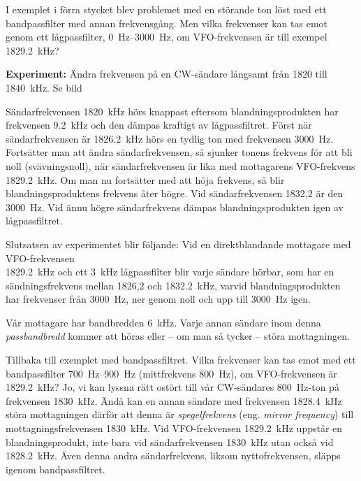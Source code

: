 I exemplet i förra stycket blev problemet med en störande ton löst med
ett bandpassfilter med annan frekvensgång.
Men vilka frekvenser kan tas emot genom ett lågpassfilter,
\SIrange{0}{3000}{\hertz}, om VFO-frekvensen är till exempel
\qty{1829,2}{\kilo\hertz}?

\textbf{Experiment:}
Ändra frekvensen på en CW-sändare långsamt från 1820 till
\qty{1840}{\kilo\hertz}.
Se bild 

Sändarfrekvensen \qty{1820}{\kilo\hertz} hörs knappast eftersom
blandningsprodukten har frekvensen \qty{9,2}{\kilo\hertz} och den dämpas
kraftigt av lågpassfiltret.
Först när sändarfrekvensen är \qty{1826,2}{\kilo\hertz} hörs en tydlig ton med
frekvensen \qty{3000}{\hertz}.
Fortsätter man att ändra sändarfrekvensen, så sjunker tonens frekvens för att
bli noll (svävningsnoll), när sändarfrekvensen är lika med mottagarens
VFO-frekvens \qty{1829,2}{\kilo\hertz}.
Om man nu fortsätter med att höja frekvens, så blir blandningsproduktens
frekvens åter högre.
Vid sändarfrekvensen 1832,2 är den \qty{3000}{\hertz}.
Vid ännu högre sändarfrekvens dämpas blandningsprodukten igen av lågpassfiltret.

Slutsatsen av experimentet blir följande:
Vid en direktblandande mottagare med VFO-frekvensen \\ \qty{1829,2}{\kilo\hertz}
och ett \qty{3}{\kilo\hertz} lågpassfilter blir varje sändare hörbar, som har en
sändningsfrekvens mellan 1826,2 och \qty{1832,2}{\kilo\hertz}, varvid
blandningsprodukten har frekvenser från \qty{3000}{\hertz}, ner genom noll och
upp till \qty{3000}{\hertz} igen.


Vår mottagare har bandbredden \qty{6}{\kilo\hertz}.
Varje annan sändare inom denna \emph{passbandbredd} kommer att höras eller --
om man så tycker -- störa mottagningen.

Tillbaka till exemplet med bandpassfiltret.
Vilka frekvenser kan tas emot med ett bandpassfilter \SIrange{700}{900}{\hertz}
(mittfrekvens \qty{800}{\hertz}), om VFO-frekvensen är \qty{1829,2}{\kilo\hertz}?
Jo, vi kan lyssna rätt ostört till vår CW-sändares \qty{800}{\hertz}-ton på
frekvensen \qty{1830}{\kilo\hertz}.
Ändå kan en annan sändare med frekvensen \qty{1828,4}{\kilo\hertz} störa
mottagningen därför att denna är \emph{spegelfrekvens} (eng. \emph{mirror
frequency}) till mottagningsfrekvensen \qty{1830}{\kilo\hertz}.
Vid VFO-frekvensen \qty{1829,2}{\kilo\hertz} uppstår en blandningsprodukt, inte
bara vid sändarfrekvensen \qty{1830}{\kilo\hertz} utan också vid
\qty{1828,2}{\kilo\hertz}.
Även denna andra sändarfrekvens, liksom nyttofrekvensen, släpps igenom
bandpassfiltret.

